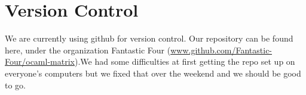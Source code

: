 \documentclass[letterpaper,11pt]{article}
\begin{document}
\section{Version Control}
We are currently using github for version control. Our repository can be found
here, under the organization Fantastic Four
(\url{www.github.com/Fantastic-Four/ocaml-matrix}).We had some difficulties at
first getting the repo set up on everyone’s computers but we fixed that over the
weekend and we should be good to go.
\end{document}
